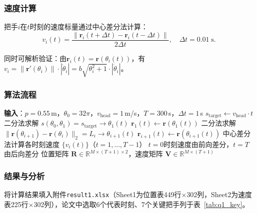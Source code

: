 \documentclass[12pt]{ctexart}
\begin{document}
\subsubsection{速度计算}

把手$i$在$t$时刻的速度标量通过中心差分法计算：
\begin{equation}
v_i(t) = \frac{\|\bm{r}_i(t+\Delta t) - \bm{r}_i(t-\Delta t)\|}{2\Delta t},\quad \Delta t=0.01\;\text{s}.
\label{eq:velocity}
\end{equation}

同时可解析验证：由$\bm{r}_i(t)=\bm{r}(\theta_i(t))$，有$v_i = \|\bm{r}'(\theta_i)\|\cdot|\dot{\theta}_i| = b\sqrt{\theta_i^2+1}\cdot|\dot{\theta}_i|$。

\subsubsection{算法流程}

\begin{algorithm}[htbp]
\caption{问题一：盘入运动学正解}
\begin{algorithmic}[1]
\State \textbf{输入}：$p=0.55$\,m，$\theta_0=32\pi$，$v_{\text{head}}=1$\,m/s，$T=300$\,s，$\Delta t=1$\,s
  \State $s_{\text{target}} \gets v_{\text{head}} \cdot t$
  \State 二分法求解 $s(\theta_0,\theta_1) = s_{\text{target}} \to \theta_1(t)$
  \State $\bm{r}_1(t) \gets \bm{r}(\theta_1(t))$
    \State 二分法求解 $\|\bm{r}(\theta_{i+1})-\bm{r}(\theta_i)\|_2 = L_i \to \theta_{i+1}(t)$
    \State $\bm{r}_{i+1}(t) \gets \bm{r}(\theta_{i+1}(t))$
  \EndFor
\EndFor
\State 中心差分法计算各时刻速度 $\{v_i(t)\}$（$t=1,\dots,T-1$）
\State $t=0$时刻速度由前向差分，$t=T$由后向差分
\State \Return 位置矩阵 $\bm{R}\in\mathbb{R}^{M\times (T+1)\times 2}$，速度矩阵 $\bm{V}\in\mathbb{R}^{M\times (T+1)}$
\end{algorithmic}
\label{alg:q1}
\end{algorithm}

\subsubsection{结果与分析}

将计算结果填入附件\texttt{result1.xlsx}（Sheet1为位置表449行$\times$302列，Sheet2为速度表225行$\times$302列），论文中选取6个代表时刻、7个关键把手列于表~\ref{tab:q1_key}。
\end{document}

